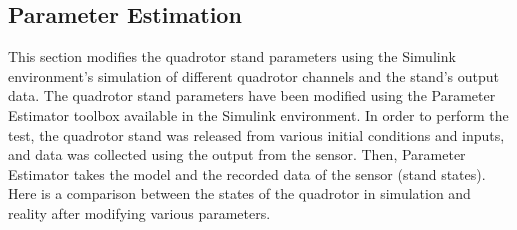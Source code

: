 \documentclass[conference]{IEEEtran}
\begin{document}
\subsection{Parameter Estimation}
This section modifies the quadrotor stand parameters using the Simulink environment's simulation of different quadrotor channels and the stand's output data.
The quadrotor stand parameters have been modified using the Parameter Estimator toolbox available in the Simulink environment.
In order to perform the test, the quadrotor stand was released from various initial conditions and inputs, and data was collected using the output from the sensor.
Then, Parameter Estimator takes the model and the recorded data of the sensor (stand states).
Here is a comparison between the states of the quadrotor in simulation and reality after modifying various parameters.
\end{document}

